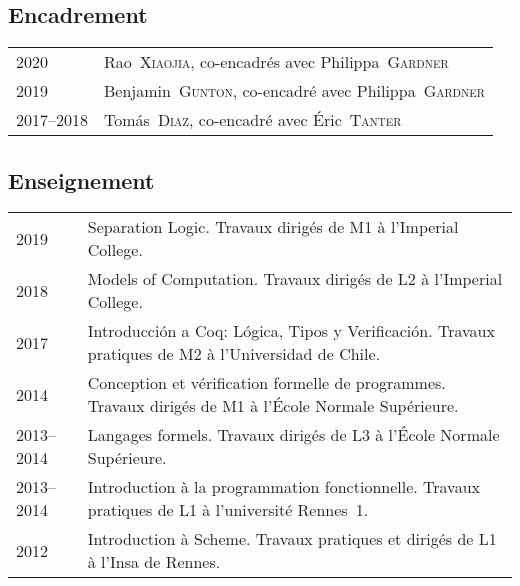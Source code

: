 \documentclass[12pt,a4paper]{article}
\makeatletter
\newcommand{\en}[1]{\foreignlanguage{english}{{#1}}}
\newcommand{\es}[1]{\foreignlanguage{spanish}{{#1}}}
\newcommand{\en}[1]{\foreignlanguage{english}{{#1}}}
\newcommand{\es}[1]{\foreignlanguage{spanish}{{#1}}}
\newenvironment{datecvsection}[1]%
               {\subsection*{#1}%
                 \noindent \begin{tabular}{@{}p{\annee}p{\texte}@{}}}
               {\end{tabular}}
\newcommand\familyName{\textsc}
\newcommand\placeName{}
\makeatother
\begin{document}
\begin{datecvsection}{Encadrement}

    2020 & Rao~\familyName{Xiaojia}, co-encadrés avec Philippa~\familyName{Gardner} \\
    2019 & Benjamin~\familyName{Gunton}, co-encadré avec Philippa~\familyName{Gardner} \\
    2017–2018 & Tomás~\familyName{Diaz}, co-encadré avec Éric~\familyName{Tanter} \\

\end{datecvsection}

\begin{datecvsection}{Enseignement}

    2019 & Separation Logic. Travaux dirigés de M1 à l’\en{\placeName{Imperial College}}. \\

    2018 & Models of Computation. Travaux dirigés de L2 à l’\en{\placeName{Imperial College}}. \\

    2017 & Introducción a Coq: Lógica, Tipos y Verificación. Travaux pratiques de M2 à l’\es{\placeName{Universidad de Chile}}. \\

    2014 & Conception et vérification formelle de programmes. Travaux dirigés de M1 à l’\placeName{École Normale Supérieure}. \\

    2013–2014 & Langages formels. Travaux dirigés de L3 à l’\placeName{École Normale Supérieure}. \\

    2013–2014 & Introduction à la programmation fonctionnelle. Travaux pratiques de L1 à l’université \placeName{Rennes}~1. \\

    2012 & Introduction à Scheme. Travaux pratiques et dirigés de L1 à l’\placeName{Insa} de \placeName{Rennes}. \\

\end{datecvsection}
\end{document}
